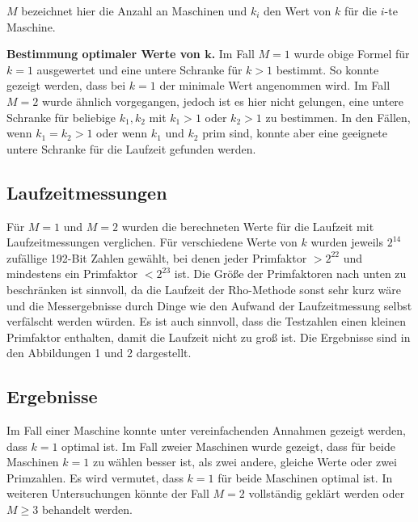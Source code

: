 \documentclass[a4paper, extrafontsizes, ngerman, 25pt]{memoir}
\begin{document}
\begin{figure}[H]
    \centering
    
\end{figure}

\noindent $M$ bezeichnet hier die Anzahl an Maschinen und $k_i$ den Wert von $k$ für die $i$-te Maschine.

\vspace{0.5cm}
\noindent \textbf{Bestimmung optimaler Werte von $\boldsymbol{k}$.} Im Fall $M = 1$ wurde obige Formel für $k = 1$ ausgewertet und eine untere Schranke für $k > 1$ bestimmt. So konnte gezeigt werden, dass bei $k = 1$ der minimale Wert angenommen wird. Im Fall $M = 2$ wurde ähnlich vorgegangen, jedoch ist es hier nicht gelungen, eine untere Schranke für beliebige $k_1, k_2$ mit $k_1 > 1$ oder $k_2 > 1$ zu bestimmen. In den Fällen, wenn $k_1 = k_2 > 1$ oder wenn $k_1$ und $k_2$ prim sind, konnte aber eine geeignete untere Schranke für die Laufzeit gefunden werden.

\subsection{Laufzeitmessungen}

Für $M = 1$ und $M = 2$ wurden die berechneten Werte für die Laufzeit mit Laufzeitmessungen verglichen. Für verschiedene Werte von $k$ wurden jeweils $2^{14}$ zufällige 192-Bit Zahlen gewählt, bei denen jeder Primfaktor $> 2^{22}$ und mindestens ein Primfaktor $< 2^{23}$ ist. Die Größe der Primfaktoren nach unten zu beschränken ist sinnvoll, da die Laufzeit der Rho-Methode sonst sehr kurz wäre und die Messergebnisse durch Dinge wie den Aufwand der Laufzeitmessung selbst verfälscht werden würden. Es ist auch sinnvoll, dass die Testzahlen einen kleinen Primfaktor enthalten, damit die Laufzeit nicht zu groß ist. Die Ergebnisse sind in den Abbildungen 1 und 2 dargestellt.

\subsection{Ergebnisse}

Im Fall einer Maschine konnte unter vereinfachenden Annahmen gezeigt werden, dass $k = 1$ optimal ist. Im Fall zweier Maschinen wurde gezeigt, dass für beide Maschinen $k = 1$ zu wählen besser ist, als zwei andere, gleiche Werte oder zwei Primzahlen. Es wird vermutet, dass $k = 1$ für beide Maschinen optimal ist. In weiteren Untersuchungen könnte der Fall $M = 2$ vollständig geklärt werden oder $M \ge 3$ behandelt werden.
\end{document}
